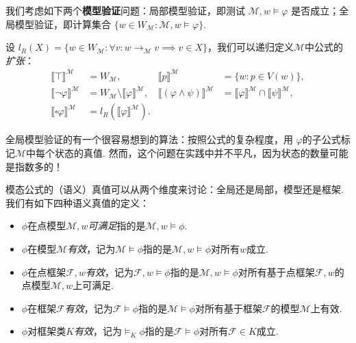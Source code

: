 \begin{remark}[模型验证]
我们考虑如下两个\textbf{模型验证}问题：局部模型验证，即测试 $\mathcal M,w \vDash \varphi$ 是否成立；全局模型验证，即计算集合 $\{w \in W_{\mathcal M} : \mathcal M,w \vDash \varphi\}$.

设 $l_R(X) = \{w \in W_{\mathcal M} : \forall v : w \to_{\mathcal M} v \implies v \in X\}$，我们可以递归定义$\mathcal M$中公式的\emph{扩张}：
\[\begin{array}{rlrl}\llbracket \top \rrbracket^{\mathcal{M}} & =W_{\mathcal{M}}, & \llbracket p \rrbracket^{\mathcal{M}} & =\{w : p \in V(w)\}, \\ 
\llbracket \neg \varphi \rrbracket^{\mathcal{M}} & =W_{\mathcal M}\setminus \llbracket \varphi \rrbracket^{\mathcal{M}}, & \llbracket(\varphi \wedge \psi) \rrbracket^{\mathcal{M}} & =\llbracket \varphi \rrbracket^{\mathcal{M}} \cap \llbracket \psi \rrbracket^{\mathcal{M}}, \\
\llbracket \square \varphi \rrbracket^{\mathcal{M}} & =l_R\left(\llbracket \varphi \rrbracket^{\mathcal{M}}\right).\end{array}\]

全局模型验证的有一个很容易想到的算法：按照公式的复杂程度，用 $\varphi$的子公式标记$\mathcal M$中每个状态的真值. 然而，这个问题在实践中并不平凡，因为状态的数量可能是指数多的！
\end{remark}

模态公式的（语义）真值可以从两个维度来讨论：全局还是局部，模型还是框架. 我们有如下四种语义真值的定义：

\begin{itemize}
    \item $\phi$在点模型$\mathcal M,w$\emph{可满足}指的是$\mathcal M,w\vDash \phi$.
    \item $\phi$在模型$\mathcal M$\emph{有效}，记为$\mathcal M\vDash \phi$指的是$\mathcal M,w\vDash\phi$对所有$w$成立.
    \item $\phi$在点框架$\mathcal F,w$\emph{有效}，记为$\mathcal F,w\vDash \phi$指的是$\mathcal M,w\vDash\phi$对所有基于点框架$\mathcal F,w$的点模型$\mathcal M, w$上可满足.
    \item $\phi$在框架$\mathcal F$\emph{有效}，记为$\mathcal F\vDash \phi$指的是$\mathcal M\vDash\phi$对所有基于框架$\mathcal F$的模型$\mathcal M$上有效.
    \item $\phi$对框架类$K$\emph{有效}，记为$\vDash_K\phi$指的是$\mathcal F\vDash\phi$对所有$\mathcal F\in K$成立.
\end{itemize}


